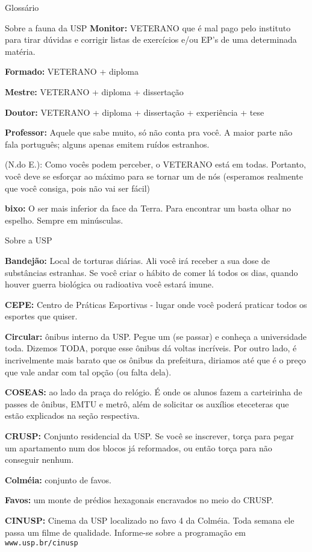 \begin{secao}{Glossário}
\begin{subsecao}{Sobre a fauna da USP}
{\bf Monitor:} VETERANO
que é mal pago pelo instituto para tirar dúvidas e corrigir
listas de exercícios e/ou EP's de uma determinada matéria.

{\bf Formado:} VETERANO + diploma

{\bf Mestre:} VETERANO + diploma + dissertação

{\bf Doutor:} VETERANO + diploma + dissertação + experiência + tese

{\bf Professor:} Aquele que sabe muito, só não conta pra você. A maior parte não fala português; alguns apenas emitem ruídos estranhos.

(N.do E.): Como vocês podem perceber, o VETERANO está em todas. Portanto, você
deve se esforçar ao máximo para se tornar um de nós (esperamos realmente que você
consiga, pois não vai ser fácil)

{\bf bixo:} O ser
mais inferior da face da Terra. Para encontrar um basta olhar no
espelho. Sempre em minúsculas.
\end{subsecao}


\begin{subsecao}{Sobre a USP}

{\bf Bandejão:} Local de torturas diárias. Ali você irá receber a sua dose
de substâncias estranhas. Se você criar o hábito de comer lá todos os dias, quando
houver guerra biológica ou radioativa você estará imune.

{\bf CEPE:} Centro de Práticas Esportivas - lugar onde você poderá praticar todos os
esportes que quiser.

{\bf Circular:} ônibus interno da USP. Pegue um (se passar) e conheça a universidade toda. Dizemos TODA, porque esse ônibus dá voltas incríveis. Por outro lado, é incrivelmente mais barato que os ônibus da prefeitura, diriamos até que é o preço que vale andar com tal opção (ou falta dela).

{\bf COSEAS:} ao lado da praça do relógio. É onde os alunos fazem a carteirinha de
passes de ônibus, EMTU e metrô, além de solicitar os auxílios eteceteras que estão
explicados na seção respectiva.

{\bf CRUSP:} Conjunto residencial da USP. Se você se inscrever, torça para pegar um
apartamento num dos blocos já reformados, ou então torça para não conseguir
nenhum.

{\bf Colméia:} conjunto de favos.

{\bf Favos:} um monte de prédios hexagonais encravados no meio do CRUSP.

{\bf CINUSP:} Cinema da USP localizado no favo 4 da Colméia. Toda semana ele
passa um filme de qualidade. Informe-se sobre a programação em
{\tt www.usp.br/cinusp} 


\end{subsecao}
\end{secao}
